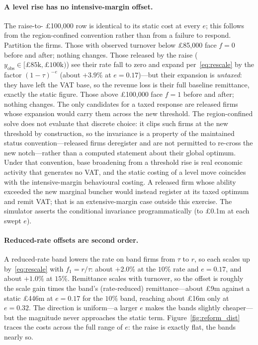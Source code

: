 \paragraph{A level rise has no intensive-margin offset.} The raise-to-
\pounds100{,}000 row is identical to its static cost at every $e$; this follows
from the region-confined convention rather than from a failure to respond. Partition the firms. Those with observed
turnover below \pounds85{,}000 face $f=0$ before and after; nothing changes.
Those released by the raise ($y_{\mathrm{obs}}\in[\pounds85\text{k},
\pounds100\text{k})$) see their rate fall to zero and expand
per~\eqref{eq:rescale} by the factor $(1-\tau)^{-e}$ (about $+3.9\%$ at
$e=0.17$)---but their expansion is \emph{untaxed}: they have left the VAT
base, so the revenue loss is their full baseline remittance, exactly the
static figure. Those above \pounds100{,}000 face $f=1$ before and after;
nothing changes. The only candidates for a taxed response are released firms
whose expansion would carry them across the new threshold. The region-confined
solve does not evaluate that discrete choice: it clips such firms at the new
threshold by construction, so the invariance is a property of the maintained
status convention---released firms deregister and are not permitted to re-cross
the new notch---rather than a computed statement about their global optimum.
Under that convention, base broadening from a threshold rise is real economic
activity that generates no VAT, and the static costing of a level move
coincides with the intensive-margin behavioural costing. A released firm whose
ability exceeded the new marginal buncher would instead register at its taxed
optimum and remit VAT; that is an extensive-margin case outside this exercise.
The simulator asserts the conditional invariance programmatically (to
\pounds0.1m at each swept $e$).

\paragraph{Reduced-rate offsets are second order.} A reduced-rate band lowers
the rate on band firms from $\tau$ to $r$, so each scales up
by~\eqref{eq:rescale} with $f_1 = r/\tau$: about $+2.0\%$ at the $10\%$ rate
and $e=0.17$, and about $+1.0\%$ at $15\%$. Remittance scales with turnover,
so the offset is roughly the scale gain times the band's (rate-reduced)
remittance---about \pounds9m against a static \pounds446m at $e=0.17$ for
the $10\%$ band, reaching about \pounds16m only at $e=0.32$. The direction is
uniform---a larger $e$ makes the bands slightly cheaper---but the magnitude
never approaches the static term. Figure~\ref{fig:reform_dist} traces the
costs across the full range of $e$: the raise is exactly flat, the bands
nearly so.

